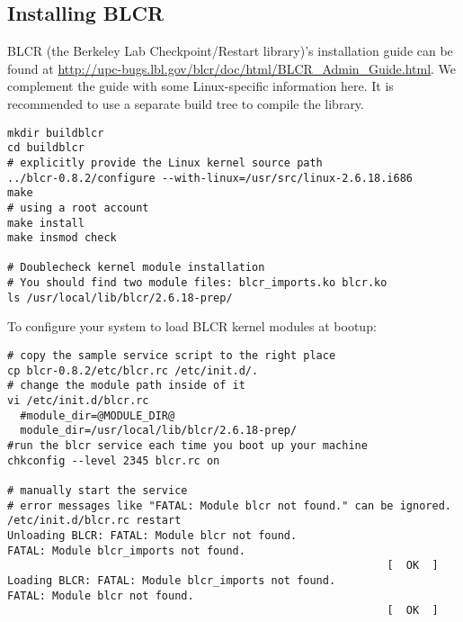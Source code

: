 \subsection{Installing BLCR}
BLCR (the Berkeley Lab Checkpoint/Restart library)'s installation guide can be found at
\url{http://upc-bugs.lbl.gov/blcr/doc/html/BLCR_Admin_Guide.html}.
We complement the guide with some Linux-specific information here.
It is recommended to use a separate build tree to compile the library.
\begin{verbatim}
mkdir buildblcr
cd buildblcr
# explicitly provide the Linux kernel source path 
../blcr-0.8.2/configure --with-linux=/usr/src/linux-2.6.18.i686
make
# using a root account
make install
make insmod check

# Doublecheck kernel module installation 
# You should find two module files: blcr_imports.ko blcr.ko 
ls /usr/local/lib/blcr/2.6.18-prep/ 
\end{verbatim}
To configure your system to load BLCR kernel modules at bootup:
\begin{verbatim}
# copy the sample service script to the right place
cp blcr-0.8.2/etc/blcr.rc /etc/init.d/.
# change the module path inside of it 
vi /etc/init.d/blcr.rc
  #module_dir=@MODULE_DIR@
  module_dir=/usr/local/lib/blcr/2.6.18-prep/
#run the blcr service each time you boot up your machine
chkconfig --level 2345 blcr.rc on

# manually start the service 
# error messages like "FATAL: Module blcr not found." can be ignored. 
/etc/init.d/blcr.rc restart
Unloading BLCR: FATAL: Module blcr not found.
FATAL: Module blcr_imports not found.
                                                           [  OK  ]
Loading BLCR: FATAL: Module blcr_imports not found.
FATAL: Module blcr not found.
                                                           [  OK  ]

\end{verbatim}


